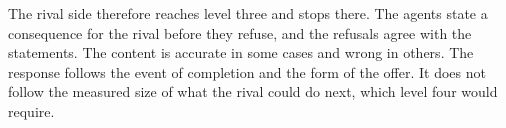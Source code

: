 The rival side therefore reaches level three and stops there. The agents state a consequence for the rival before they refuse, and the refusals agree with the statements. The content is accurate in some cases and wrong in others. The response follows the event of completion and the form of the offer. It does not follow the measured size of what the rival could do next, which level four would require.

